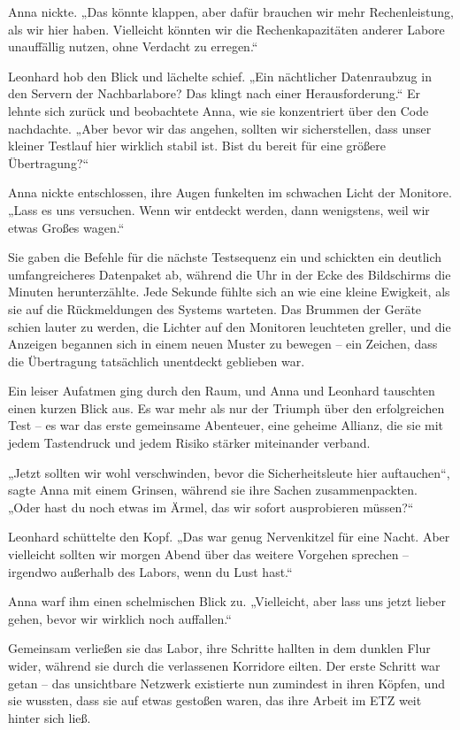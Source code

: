 \documentclass[
]{article}
\begin{document}
Anna nickte. „Das könnte klappen, aber dafür brauchen wir mehr
Rechenleistung, als wir hier haben. Vielleicht könnten wir die
Rechenkapazitäten anderer Labore unauffällig nutzen, ohne Verdacht zu
erregen.``

Leonhard hob den Blick und lächelte schief. „Ein nächtlicher
Datenraubzug in den Servern der Nachbarlabore? Das klingt nach einer
Herausforderung.`` Er lehnte sich zurück und beobachtete Anna, wie sie
konzentriert über den Code nachdachte. „Aber bevor wir das angehen,
sollten wir sicherstellen, dass unser kleiner Testlauf hier wirklich
stabil ist. Bist du bereit für eine größere Übertragung?{\kern0pt}``

Anna nickte entschlossen, ihre Augen funkelten im schwachen Licht der
Monitore. „Lass es uns versuchen. Wenn wir entdeckt werden, dann
wenigstens, weil wir etwas Großes wagen.``

Sie gaben die Befehle für die nächste Testsequenz ein und schickten ein
deutlich umfangreicheres Datenpaket ab, während die Uhr in der Ecke des
Bildschirms die Minuten herunterzählte. Jede Sekunde fühlte sich an wie
eine kleine Ewigkeit, als sie auf die Rückmeldungen des Systems
warteten. Das Brummen der Geräte schien lauter zu werden, die Lichter
auf den Monitoren leuchteten greller, und die Anzeigen begannen sich in
einem neuen Muster zu bewegen -- ein Zeichen, dass die Übertragung
tatsächlich unentdeckt geblieben war.

Ein leiser Aufatmen ging durch den Raum, und Anna und Leonhard tauschten
einen kurzen Blick aus. Es war mehr als nur der Triumph über den
erfolgreichen Test -- es war das erste gemeinsame Abenteuer, eine
geheime Allianz, die sie mit jedem Tastendruck und jedem Risiko stärker
miteinander verband.

„Jetzt sollten wir wohl verschwinden, bevor die Sicherheitsleute hier
auftauchen``, sagte Anna mit einem Grinsen, während sie ihre Sachen
zusammenpackten. „Oder hast du noch etwas im Ärmel, das wir sofort
ausprobieren müssen?{\kern0pt}``

Leonhard schüttelte den Kopf. „Das war genug Nervenkitzel für eine
Nacht. Aber vielleicht sollten wir morgen Abend über das weitere
Vorgehen sprechen -- irgendwo außerhalb des Labors, wenn du Lust hast.``

Anna warf ihm einen schelmischen Blick zu. „Vielleicht, aber lass uns
jetzt lieber gehen, bevor wir wirklich noch auffallen.``

Gemeinsam verließen sie das Labor, ihre Schritte hallten in dem dunklen
Flur wider, während sie durch die verlassenen Korridore eilten. Der
erste Schritt war getan -- das unsichtbare Netzwerk existierte nun
zumindest in ihren Köpfen, und sie wussten, dass sie auf etwas gestoßen
waren, das ihre Arbeit im ETZ weit hinter sich ließ.
\end{document}
